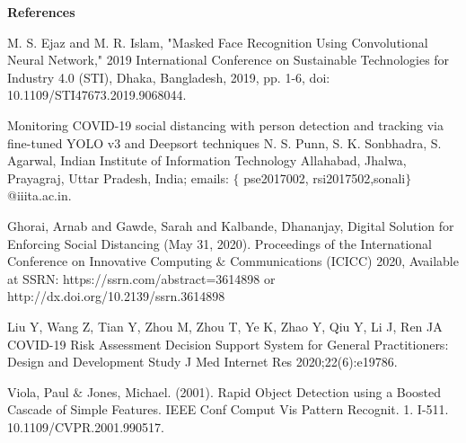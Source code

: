 \documentclass[12pt]{article}
\begin{document}
\begin{Center}
{\fontsize{18pt}{21.6pt}\selectfont \textbf{References}}
\end{Center}
\vspace{\baselineskip}
\begin{justify}
[1] M. S. Ejaz and M. R. Islam, "Masked Face Recognition Using Convolutional Neural Network," 2019 International Conference on Sustainable Technologies for Industry 4.0 (STI), Dhaka, Bangladesh, 2019, pp. 1-6, doi: 10.1109/STI47673.2019.9068044.
\end{justify}
\begin{justify}
 [2] Monitoring COVID-19 social distancing with person detection and tracking via fine-tuned YOLO v3 and Deepsort techniques N. S. Punn, S. K. Sonbhadra, S. Agarwal, Indian Institute of Information Technology Allahabad, Jhalwa, Prayagraj, Uttar Pradesh, India; emails: $ \{ $ pse2017002, rsi2017502,sonali$ \} $ @iiita.ac.in.
\end{justify}
\begin{justify}
 [3] Ghorai, Arnab and Gawde, Sarah and Kalbande, Dhananjay, Digital Solution for Enforcing Social Distancing (May 31, 2020). Proceedings of the International Conference on Innovative Computing $\&$  Communications (ICICC) 2020, Available at SSRN: https://ssrn.com/abstract=3614898 or http://dx.doi.org/10.2139/ssrn.3614898
\end{justify}
\begin{justify}
 [4] Liu Y, Wang Z, Tian Y, Zhou M, Zhou T, Ye K, Zhao Y, Qiu Y, Li J, Ren JA COVID-19 Risk Assessment Decision Support System for General Practitioners: Design and Development Study J Med Internet Res 2020;22(6):e19786.
\end{justify}
\begin{justify}
 [5]Viola, Paul $\&$  Jones, Michael. (2001). Rapid Object Detection using a Boosted Cascade of Simple Features. IEEE Conf Comput Vis Pattern Recognit. 1. I-511. 10.1109/CVPR.2001.990517. 
\end{justify}
\setlength{\parskip}{2.52pt}
\printbibliography
\end{document}
